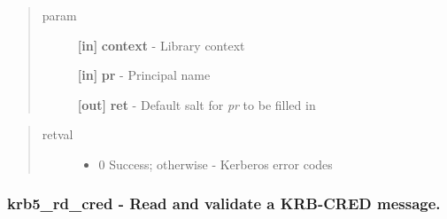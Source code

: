 \documentclass[letterpaper,10pt,english]{sphinxmanual}
\begin{document}
\begin{quote}\begin{description}
\item[{param}] \leavevmode
\textbf{{[}in{]}} \textbf{context} - Library context

\textbf{{[}in{]}} \textbf{pr} - Principal name

\textbf{{[}out{]}} \textbf{ret} - Default salt for \emph{pr} to be filled in

\end{description}\end{quote}
\begin{quote}\begin{description}
\item[{retval}] \leavevmode\begin{itemize}
\item {} 
0   Success; otherwise - Kerberos error codes

\end{itemize}

\end{description}\end{quote}


\subsubsection{krb5\_rd\_cred -  Read and validate a KRB-CRED message.}
\label{appdev/refs/api/krb5_rd_cred:krb5-rd-cred-read-and-validate-a-krb-cred-message}\label{appdev/refs/api/krb5_rd_cred::doc}

\begin{fulllineitems}
\label{appdev/refs/api/krb5_rd_cred:c.krb5_rd_cred}
\end{fulllineitems}
\end{document}

